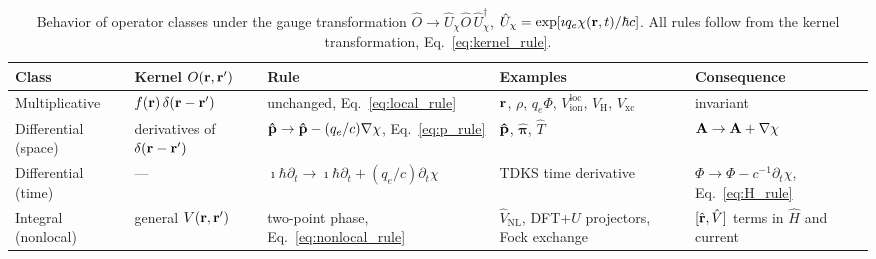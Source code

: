 \begin{table}[tb]
\caption{Behavior of operator classes under the gauge transformation
$\hat O\to\hat U_\chi\hat O\,\hat U_\chi^\dagger$,
$\hat U_\chi=\exp[\imath q_e\chi(\vb{r},t)/\hbar c]$. All rules follow from the
kernel transformation, Eq.~\eqref{eq:kernel_rule}.}
\label{tab:gauge_operator_classes}
\centering
\small
\setlength{\tabcolsep}{4pt}
\renewcommand{\arraystretch}{1.3}
\begin{tabular}{p{}p{}p{}p{}p{}}
\hline
\raggedright Class
 & \raggedright Kernel $O(\vb{r},\vb{r}')$
 & \raggedright Rule
 & \raggedright Examples
 & \raggedright Consequence \tabularnewline
\hline
\raggedright Multiplicative
 & \raggedright $f(\vb{r})\,\delta(\vb{r}-\vb{r}')$
 & \raggedright unchanged, Eq.~\eqref{eq:local_rule}
 & \raggedright $\vb{r}$, $\rho$, $q_e\Phi$, $V^{\mathrm{loc}}_{\mathrm{ion}}$, $V_{\mathrm H}$, $V_{\mathrm{xc}}$
 & \raggedright invariant \tabularnewline
\raggedright Differential (space)
 & \raggedright derivatives of $\delta(\vb{r}-\vb{r}')$
 & \raggedright $\vb{\hat p}\to\vb{\hat p}-(q_e/c)\nabla\chi$, Eq.~\eqref{eq:p_rule}
 & \raggedright $\vb{\hat p}$, $\hat{\boldsymbol{\pi}}$, $\hat T$
 & \raggedright $\vb{A}\to\vb{A}+\nabla\chi$ \tabularnewline
\raggedright Differential (time)
 & \raggedright ---
 & \raggedright $\imath\hbar\partial_t\to\imath\hbar\partial_t+(q_e/c)\partial_t\chi$
 & \raggedright TDKS time derivative
 & \raggedright $\Phi\to\Phi-c^{-1}\partial_t\chi$, Eq.~\eqref{eq:H_rule} \tabularnewline
\raggedright Integral (nonlocal)
 & \raggedright general $V(\vb{r},\vb{r}')$
 & \raggedright two-point phase, Eq.~\eqref{eq:nonlocal_rule}
 & \raggedright $\hat V_{\mathrm{NL}}$, DFT+$U$ projectors, Fock exchange
 & \raggedright $[\hat{\vb{r}},\hat V]$ terms in $\hat H$ and current \tabularnewline
\hline
\end{tabular}
\end{table}
